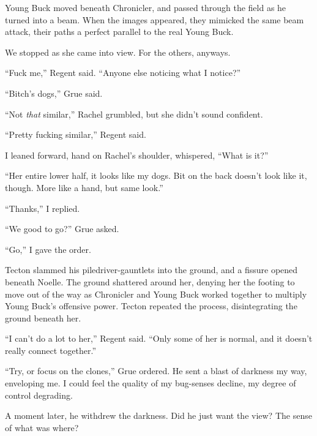 Young Buck moved beneath Chronicler, and passed through the field as he turned into a beam.  When the images appeared, they mimicked the same beam attack, their paths a perfect parallel to the real Young Buck.



We stopped as she came into view.  For the others, anyways.



``Fuck me,'' Regent said.  ``Anyone else noticing what I notice?''



``Bitch's dogs,'' Grue said.



``Not \emph{that} similar,'' Rachel grumbled, but she didn't sound confident.



``Pretty fucking similar,'' Regent said.



I leaned forward, hand on Rachel's shoulder, whispered, ``What is it?''



``Her entire lower half, it looks like my dogs.  Bit on the back doesn't look like it, though.  More like a hand, but same look.''



``Thanks,'' I replied.



``We good to go?'' Grue asked.



``Go,'' I gave the order.



Tecton slammed his piledriver-gauntlets into the ground, and a fissure opened beneath Noelle.  The ground shattered around her, denying her the footing to move out of the way as Chronicler and Young Buck worked together to multiply Young Buck's offensive power.  Tecton repeated the process, disintegrating the ground beneath her.



``I can't do a lot to her,'' Regent said.  ``Only some of her is normal, and it doesn't really connect together.''



``Try, or focus on the clones,'' Grue ordered.  He sent a blast of darkness my way, enveloping me.  I could feel the quality of my bug-senses decline, my degree of control degrading.



A moment later, he withdrew the darkness.  Did he just want the view?  The sense of what was where?



